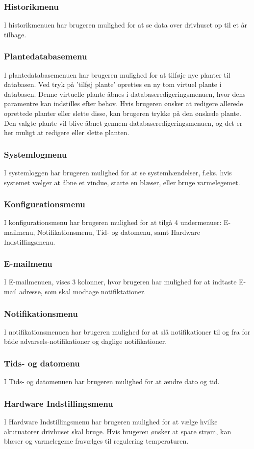 \subsubsection{Historikmenu}
I historikmenuen har brugeren mulighed for at se data over drivhuset op til et år tilbage.

\subsubsection{Plantedatabasemenu}
I plantedatabasemenuen har brugeren mulighed for at tilføje nye planter til databasen. Ved tryk på 'tilføj plante' oprettes en ny tom virtuel plante i databasen. Denne virtuelle plante åbnes i databaseredigeringsmenuen, hvor dens paramentre kan indstilles efter behov. Hvis brugeren ønsker at redigere allerede oprettede planter eller slette disse, kan brugeren trykke på den ønskede plante. Den valgte plante vil blive åbnet gennem databaseredigeringsmenuen, og det er her muligt at redigere eller slette planten.

\subsubsection{Systemlogmenu}
I systemloggen har brugeren mulighed for at se systemhændelser, f.eks. hvis systemet vælger at åbne et vindue, starte en blæser, eller bruge varmelegemet.

\subsubsection{Konfigurationsmenu}
I konfigurationsmenu har brugeren mulighed for at tilgå 4 undermenuer: E-mailmenu, Notifikationsmenu, Tid- og datomenu, samt Hardware Indstillingsmenu.

\subsubsection{E-mailmenu} \label{sec:mailmenu}
I E-mailmenuen, vises 3 kolonner, hvor brugeren har mulighed for at indtaste E-mail adresse, som skal modtage notifiktationer. 

\subsubsection{Notifikationsmenu} 
I notifikationsmenuen har brugeren mulighed for at slå notifikationer til og fra for både advarsels-notifikationer og daglige notifikationer. 

\subsubsection{Tids- og datomenu} 
I Tids- og datomenuen har brugeren mulighed for at ændre dato og tid. 

\subsubsection{Hardware Indstillingsmenu} 
I Hardware Indstillingsmenu har brugeren mulighed for at vælge hvilke akutuatorer drivhuset skal bruge. Hvis brugeren ønsker at spare strøm, kan blæser og varmelegeme fravælges til regulering temperaturen.

\clearpage